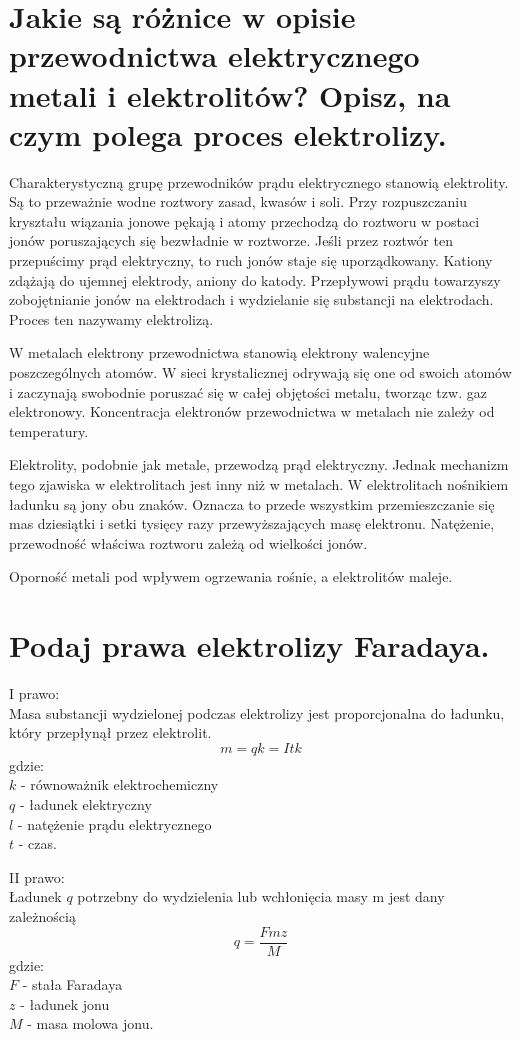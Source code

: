 \documentclass[a4paper,11pt]{article} %
\begin{document}
\section{Jakie są różnice w opisie przewodnictwa elektrycznego metali i
elektrolitów? Opisz, na czym polega proces elektrolizy.}
Charakterystyczną grupę przewodników prądu elektrycznego stanowią elektrolity. Są to przeważnie wodne roztwory zasad, kwasów i soli. Przy rozpuszczaniu kryształu wiązania jonowe pękają i atomy przechodzą do roztworu w postaci jonów poruszających się bezwładnie w roztworze. Jeśli przez roztwór ten przepuścimy prąd elektryczny, to ruch jonów staje się uporządkowany. Kationy zdążają do ujemnej elektrody, aniony do katody. Przepływowi prądu towarzyszy zobojętnianie jonów na elektrodach i wydzielanie się substancji na elektrodach. Proces ten nazywamy elektrolizą.

W metalach elektrony przewodnictwa stanowią elektrony walencyjne poszczególnych atomów. W sieci krystalicznej odrywają się one od swoich atomów i zaczynają swobodnie poruszać się w całej objętości metalu, tworząc tzw. gaz elektronowy. Koncentracja elektronów przewodnictwa w metalach nie zależy od temperatury.

Elektrolity, podobnie jak metale, przewodzą prąd elektryczny. Jednak mechanizm tego zjawiska w elektrolitach jest inny niż w metalach. W elektrolitach nośnikiem ładunku są jony obu znaków. Oznacza to przede wszystkim przemieszczanie się mas dziesiątki i setki tysięcy razy przewyższających masę elektronu. Natężenie, przewodność właściwa roztworu zależą od wielkości jonów. 

Oporność metali pod wpływem ogrzewania rośnie, a elektrolitów maleje. 
\section{Podaj prawa elektrolizy Faradaya.}
I prawo:\\
Masa substancji wydzielonej podczas elektrolizy jest proporcjonalna do ładunku, który przepłynął przez elektrolit. 
$$m = qk=Itk$$
gdzie: \\
$k$ - równoważnik elektrochemiczny\\
$q$ - ładunek elektryczny\\
$l$ - natężenie prądu elektrycznego\\
$t$ - czas.

II prawo:\\
Ładunek $q$ potrzebny do wydzielenia lub wchłonięcia masy m jest dany zależnością
$$q = \frac{Fmz}{M}$$
gdzie:\\
$F$ - stała Faradaya\\
$z$ - ładunek jonu\\
$M$ - masa molowa jonu.
\end{document}
